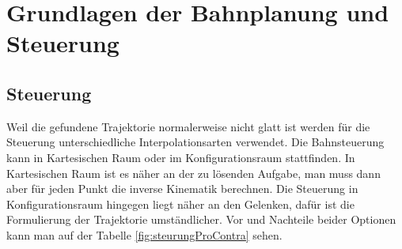 %

%
%



\section{Grundlagen der Bahnplanung und Steuerung}


\subsection{Steuerung}
\label{bahnplanung_steuerung_sec}

Weil die gefundene Trajektorie normalerweise nicht glatt ist werden für die Steuerung unterschiedliche Interpolationsarten verwendet. Die Bahnsteuerung kann in Kartesischen Raum oder im Konfigurationsraum stattfinden. In Kartesischen Raum ist es näher an der zu lösenden Aufgabe, man muss dann aber für jeden Punkt die inverse Kinematik berechnen. Die Steuerung in Konfigurationsraum hingegen liegt näher an den Gelenken, dafür ist die Formulierung der Trajektorie umständlicher. Vor und Nachteile beider Optionen kann man auf der Tabelle \ref{fig:steurungProContra} sehen.



